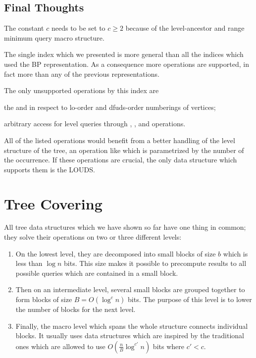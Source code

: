 \subsection{Final Thoughts}

The constant $c$ needs to be set to $c \ge 2$ because of the level-ancestor and range minimum query macro structure.

\bigbreak

The single index which we presented is more general than all the indices which used the BP representation.
As a consequence more operations are supported, in fact more than any of the previous representations.

The only unsupported operations by this index are
\begin{enuminline}
	\item the \rank{} and \select{} in respect to lo-order and dfuds-order numberings of vertices;
	\item arbitrary access for level queries through \levelSize{}, \levelRank{}, and \levelSelect{} operations.
\end{enuminline}

All of the listed operations would benefit from a better handling of the level structure of the tree, an operation like \fwdSearch{} which is parametrized by the number of the occurrence.
If these operations are crucial, the only data structure which supports them is the LOUDS.

\section{Tree Covering}\label{s:TC}

All tree data structures which we have shown so far have one thing in common; they solve their operations on two or three different levels:
\begin{enumerate}
	\item On the lowest level, they are decomposed into small blocks of size $b$ which is less than $\log n$ bits.
	This size makes it possible to precompute results to all possible queries which are contained in a small block.
	
	\item Then on an intermediate level, several small blocks are grouped together to form blocks of size $B = O(\log^c n)$ bits.
	The purpose of this level is to lower the number of blocks for the next level.
	
	\item Finally, the macro level which spans the whole structure connects individual blocks.
	It usually uses data structures which are inspired by the traditional ones which are allowed to use $O\left(\frac{n}{B} \log^{c'} n\right)$ bits where $c' < c$.
\end{enumerate}

